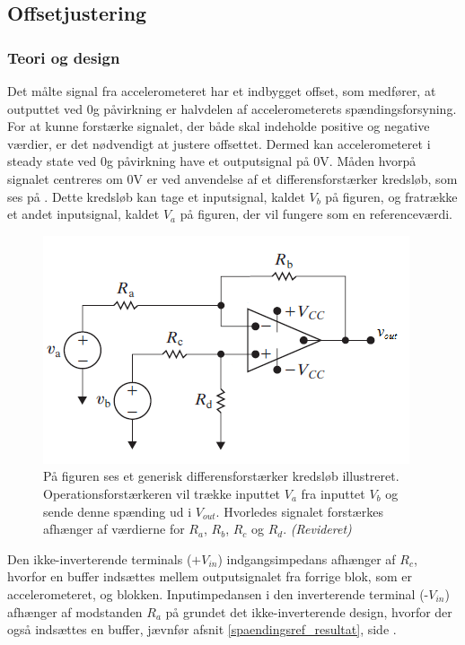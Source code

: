 \subsection{Offsetjustering}
\subsubsection{Teori og design} \label{Offset_Teori_Design}
Det målte signal fra accelerometeret har et indbygget offset, som medfører, at outputtet ved $0$g påvirkning er halvdelen af accelerometerets spændingsforsyning. For at kunne forstærke signalet, der både skal indeholde positive og negative værdier, er det nødvendigt at justere offsettet. Dermed kan accelerometeret i steady state ved $0$g påvirkning have et outputsignal på $0$V. Måden hvorpå signalet centreres om $0$V er ved anvendelse af et differensforstærker kredsløb, som ses på . Dette kredsløb kan tage et inputsignal, kaldet $V_{b}$ på figuren, og fratrække et andet inputsignal, kaldet $V_{a}$ på figuren, der vil fungere som en referenceværdi.
\begin{figure}[H]
\centering
\includegraphics[scale=1.3]{figures/cProblemloesning/Differensforstaerker_generisk1.png}
\caption{På figuren ses et generisk differensforstærker kredsløb illustreret. Operationsforstærkeren vil trække inputtet $V_{a}$ fra inputtet $V_{b}$ og sende denne spænding ud i $V_{out}$. Hvorledes signalet forstærkes afhænger af værdierne for $R_{a}$, $R_{b}$, $R_{c}$ og $R_{d}$. \textit{(Revideret)} \cite{Nilsson2011}}
\label{fig:Differensforstaerker_generisk}
\end{figure}
\noindent Den ikke-inverterende terminals ($+V_{in}$) indgangsimpedans afhænger af $R_{c}$, hvorfor en buffer indsættes mellem outputsignalet fra forrige blok, som er accelerometeret, og blokken. Inputimpedansen i den inverterende terminal (-$V_{in}$) afhænger af modstanden $R_{a}$ på  grundet det ikke-inverterende design, hvorfor der også indsættes en buffer, jævnfør afsnit \ref{spaendingsref_resultat}, side \pageref{spaendingsref_resultat}. \\

